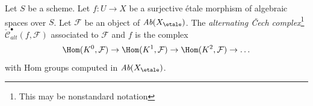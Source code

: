 \begin{definition}
\label{definition-alternating-cech-complex}
Let $S$ be a scheme. Let $f : U \to X$ be a surjective \'etale morphism
of algebraic spaces over $S$. Let $\mathcal{F}$ be an object of
$\textit{Ab}(X_\etale)$. The
{\it alternating {\v C}ech complex}\footnote{This may be nonstandard notation}
$\check{\mathcal{C}}^\bullet_{alt}(f, \mathcal{F})$
associated to $\mathcal{F}$ and $f$ is the complex
$$
\Hom(K^0, \mathcal{F}) \to \Hom(K^1, \mathcal{F}) \to
\Hom(K^2, \mathcal{F}) \to \ldots
$$
with Hom groups computed in $\textit{Ab}(X_\etale)$.
\end{definition}